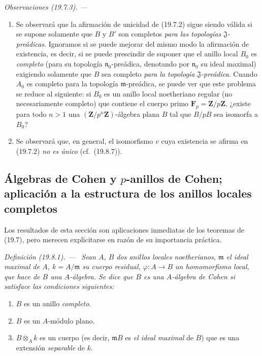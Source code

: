 \documentclass[10pt,oneside]{book}
\makeatletter
\newcommand{\setmanualcurrentlabel}[1]{\def\@currentlabel{#1}}
\newenvironment{definition}[1][]{%
  \setmanualcurrentlabel{#1}\par\medskip\noindent\itshape Definición (#1). ---\ }{\par}
\newenvironment{remarks}[1][]{%
  \setmanualcurrentlabel{#1}\par\medskip\noindent\itshape Observaciones (#1). ---\ }{\par}
\makeatother
\begin{document}
\begin{remarks}[19.7.3]
\label{0.19.7.3-es}
\begin{enumerate}
  \item[(i)] Se observará que la afirmación de unicidad de (19.7.2) sigue siendo
  válida si se supone solamente que $B$ y $B'$ son completos \emph{para
  las topologías $\mathfrak J$-preádicas}. Ignoramos si se puede
  mejorar del mismo modo la afirmación de existencia, es decir, si se puede
  prescindir de suponer que el anillo local $B_0$ es \emph{completo} (para su topología
  $\mathfrak n_0$-preádica, denotando por $\mathfrak n_0$ su ideal
  maximal) exigiendo solamente que $B$ sea completo \emph{para la topología
  $\mathfrak J$-preádica}. Cuando $A_0$ es completo para la topología
  $\mathfrak m$-preádica, se puede ver que este problema se reduce al siguiente:
  si $B_0$ es un anillo local noetheriano regular (no necesariamente
  completo) que contiene el cuerpo primo $\mathbf F_p=\mathbf Z/p\mathbf Z$,
  ¿existe para todo $n>1$ una $(\mathbf Z/p^n\mathbf Z)$-álgebra plana $B$
  tal que $B/pB$ sea isomorfa a $B_0$?
  \item[(ii)] Se observará que, en general, el isomorfismo $v$ cuya existencia se
  afirma en (19.7.2) \emph{no es único} (cf.~(19.8.7)).
\end{enumerate}
\end{remarks}

\subsection{Álgebras de Cohen y $p$-anillos de Cohen; aplicación a la
estructura de los anillos locales completos}
\label{subsection:0.19.8-es}

Los resultados de esta sección son aplicaciones inmediatas de los teoremas
de (19.7), pero merecen explicitarse en razón de su importancia
práctica.

\begin{definition}[19.8.1]
\label{0.19.8.1-es}
Sean $A$, $B$ dos anillos locales noetherianos, $\mathfrak m$ el ideal maximal
de $A$, $k=A/\mathfrak m$ su cuerpo residual,
$\varphi:A\to B$ un homomorfismo local, que hace de $B$ una $A$-álgebra. Se
dice que $B$ es una $A$-álgebra de Cohen si satisface las condiciones
siguientes:
\begin{enumerate}
  \item[(i)] $B$ es un anillo \emph{completo}.
  \item[(ii)] $B$ es un $A$-módulo plano.
  \item[(iii)] $B\otimes_A k$ es un cuerpo \textup{(es decir,
  $\mathfrak mB$ es \emph{el ideal maximal} de $B$)} que es una extensión
  \emph{separable} de $k$.
\end{enumerate}
\end{definition}
\end{document}
